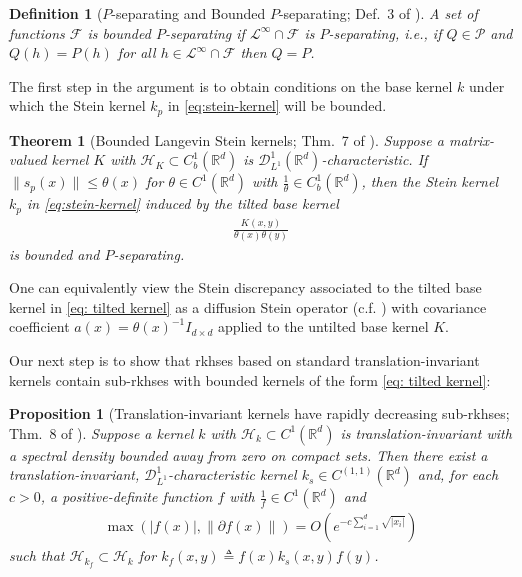 \documentclass[12pt,paper=letter]{scrreprt}
\newtheorem{theorem}{Theorem}[chapter]
\newtheorem{proposition}{Proposition}[chapter]
\newtheorem{definition}{Definition}[chapter]
\newcommand{\sss}[1]{\scriptscriptstyle{#1}}
\def\R{\mathbb{R}}
\def\defeq{\triangleq} %
\def\defn{\defeq} %
\def\norm#1{\left\|{#1}\right\|} %
\newcommand{\Pset}[0]{\mathcal{P}} %
\renewcommand{\k}{k}
\def\F{\mathcal{F}}
\def\H{\mathcal{H}}
\newcommand{\Dset}{\mathscr{D}}
\newcommand{\DL}[1]{\Dset^{#1}_{\sss{L^1}}}
\newcommand{\growth}{\theta}
\begin{document}
\begin{definition}[$P$-separating and Bounded $P$-separating; Def.~3 of \citealp{barp2022targeted}]
A set of functions $\F$  is \emph{bounded $P$-separating}  if $\mathcal{L}^\infty \cap \F$ is \emph{$P$-separating},
i.e., if $Q \in \Pset$ and $Q(h) = P(h)$ for all $h \in \mathcal{L}^\infty \cap \F$ then $Q =P$.
\end{definition}

The first step in the argument is to obtain conditions on the base kernel $k$ under which the Stein kernel $k_p$ in \eqref{eq:stein-kernel} will be bounded.


\begin{theorem}[Bounded Langevin Stein kernels; Thm.~7 of \citealp{barp2022targeted}]\label{thm: tilted controls tightness}
  Suppose a matrix-valued kernel $K$ with $\H_{K} \subset C_b^1(\R^d)$ is $\DL{1}(\R^d)$-characteristic. 
  If $\|s_p( x) \| \leq \growth(x)$  for $\growth\in C^1(\mathbb{R}^d)$ with  $ \frac{1}{\theta} \in C_b^1(\mathbb{R}^d)$, then the Stein kernel $k_p$ in \eqref{eq:stein-kernel} induced by the tilted base kernel 
  \begin{align}
  \frac{K(x,y)}{\growth(x)\growth(y)} \label{eq: tilted kernel}
  \end{align} 
  is bounded and $P$-separating.
\end{theorem}

\noindent One can equivalently view the Stein discrepancy associated to the tilted base kernel in \eqref{eq: tilted kernel} as a diffusion Stein operator (c.f. ) with covariance coefficient $a(x) = \theta(x)^{-1} I_{d \times d}$ applied to the untilted base kernel $K$.

Our next step is to show that \ac{rkhs}es based on standard translation-invariant kernels contain sub-\ac{rkhs}es with bounded kernels of the form \eqref{eq: tilted kernel}:

\begin{proposition}[Translation-invariant kernels have rapidly decreasing sub-\ac{rkhs}es; Thm.~8 of \citealp{barp2022targeted}]
\label{thm:Schwarz-tilted sub-RKHS}
Suppose a kernel $\k$ with $\H_{\k} \subset C^1(\mathbb{R}^d)$ is translation-invariant with a spectral density bounded away from zero on compact sets.
Then  there exist a translation-invariant,  $\DL{1}$-characteristic kernel $\k_s\in C^{(1,1)}(\mathbb{R}^d)$  and, for each $ c>0$, a positive-definite
function $f$ with 
$\frac{1}{f} \in C^1(\mathbb{R}^d)$ and
\begin{align*}
\max(|f(x)|, \norm{\partial f(x)}) = O(e^{-c\sum_{i=1}^d \sqrt{|x_i|}})
\end{align*}
such that
$\H_{\k_f}\subset \H_{\k}$ for $\k_f( x, y) \defn f( x)\k_s( x, y)f( y)$.
\end{proposition}
\end{document}
